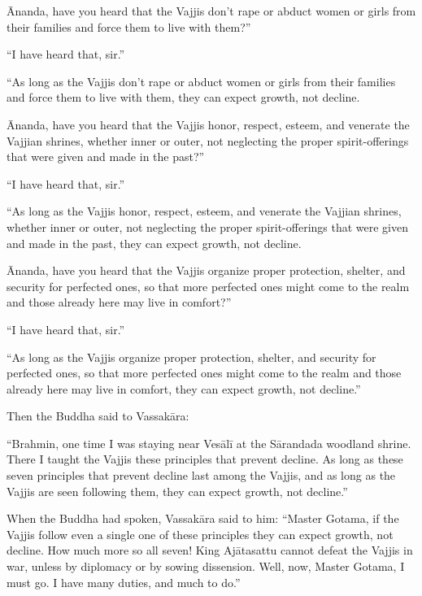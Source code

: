 \documentclass[12pt,openany]{book}%
\begin{document}
Ānanda, have you heard that the Vajjis don’t rape or abduct women or girls from their families and force them to live with them?” 

“I have heard that, sir.” 

“As long as the Vajjis don’t rape or abduct women or girls from their families and force them to live with them, they can expect growth, not decline. 

Ānanda, have you heard that the Vajjis honor, respect, esteem, and venerate the Vajjian shrines, whether inner or outer, not neglecting the proper spirit-offerings that were given and made in the past?” 

“I have heard that, sir.” 

“As long as the Vajjis honor, respect, esteem, and venerate the Vajjian shrines, whether inner or outer, not neglecting the proper spirit-offerings that were given and made in the past, they can expect growth, not decline. 

Ānanda, have you heard that the Vajjis organize proper protection, shelter, and security for perfected ones, so that more perfected ones might come to the realm and those already here may live in comfort?” 

“I have heard that, sir.” 

“As long as the Vajjis organize proper protection, shelter, and security for perfected ones, so that more perfected ones might come to the realm and those already here may live in comfort, they can expect growth, not decline.” 

Then the Buddha said to \textsanskrit{Vassakāra}: 

“Brahmin, one time I was staying near \textsanskrit{Vesālī} at the \textsanskrit{Sārandada} woodland shrine. There I taught the Vajjis these principles that prevent decline. As long as these seven principles that prevent decline last among the Vajjis, and as long as the Vajjis are seen following them, they can expect growth, not decline.” 

When the Buddha had spoken, \textsanskrit{Vassakāra} said to him: “Master Gotama, if the Vajjis follow even a single one of these principles they can expect growth, not decline. How much more so all seven! King \textsanskrit{Ajātasattu} cannot defeat the Vajjis in war, unless by diplomacy or by sowing dissension. Well, now, Master Gotama, I must go. I have many duties, and much to do.” 
\end{document}
